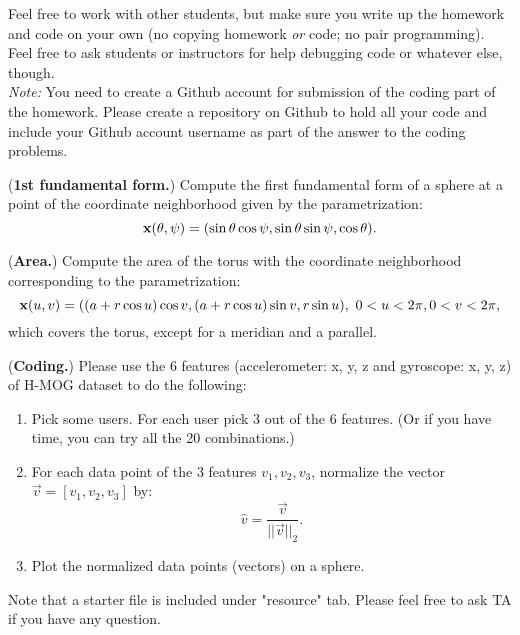 \documentclass[12pt,letterpaper]{hmcpset}
\begin{document}
	Feel free to work with other students, but make sure you write up the homework
	and code on your own (no copying homework \textit{or} code; no pair programming).
	Feel free to ask students or instructors for help debugging code or whatever else,
	though.\\
	
	\textit{Note:} You need to create a Github account for submission of the coding part of the homework. Please create a repository on Github to hold all your code and include your Github account username as part of the answer to the coding problems.
	
	\begin{problem}[1]
		(\textbf{1st fundamental form.}) Compute the first fundamental form of a sphere at a point of the coordinate neighborhood given by the parametrization:
		$$
	\textbf x(\theta,\psi)=(\sin\theta\cos\psi, \sin\theta\sin\psi, \cos\theta).
		$$
	\end{problem}
	\begin{solution}
		\vfill
	\end{solution}
	\newpage
	
	
	
	
	\begin{problem}[2]
		(\textbf{Area.}) Compute the area of the torus  with the coordinate neighborhood corresponding to the parametrization: 
		$$\textbf x(u,v)=((a+r\cos u)\cos v, (a+r\cos u)\sin v, r\sin u), ~0<u<2\pi, 0<v<2\pi,$$
		which covers the torus, except for a meridian and a parallel.
		
		
	\end{problem}
	\begin{solution}
		\vfill
	\end{solution}
	\newpage
	
	
	
	\begin{problem}[3]
		(\textbf{Coding.}) Please use the 6 features (accelerometer: x, y, z and gyroscope: x, y, z) of  H-MOG dataset to do the following:
		\begin{enumerate}
\item Pick some users. For each user pick 3 out of the 6 features. (Or if you have time, you can try all the 20 combinations.)
\item  For each data point of the 3 features $v_1, v_2, v_3$, normalize the vector $\vec{v}=[v_1, v_2, v_3]$  by:
$$\hat v=\frac{\vec{v}}{||\vec{v}||_2}.$$
\item Plot the normalized data points (vectors) on a sphere.
		\end{enumerate}
Note that a starter file is included under "resource" tab. Please feel free to ask TA if you have any question.	
		
	\end{problem}
	\begin{solution}
		\vfill
	\end{solution}
	\newpage
\end{document}
